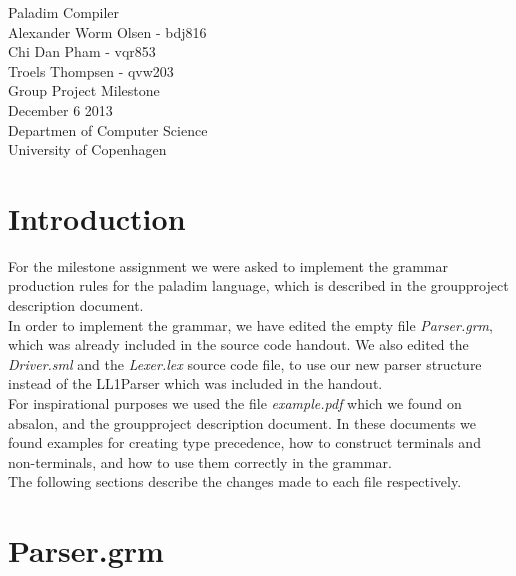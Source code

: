 \documentclass[12pt,a4paper,english]{article}
\begin{document}
\begin{titlepage}
    \vspace*{\fill}
    \begin{center}
      {\Huge Paladim Compiler}\\[0.7cm]
      {\large Alexander Worm Olsen - bdj816}\\[0.4cm]
      {\large Chi Dan Pham - vqr853}\\[0.4cm]
      {\large Troels Thompsen - qvw203}\\[0.4cm]
      {\small Group Project Milestone}\\[0.3cm]
      {\small December 6 2013}\\[0.3cm] 
      {\small Departmen of Computer Science}\\
      {\small University of Copenhagen}
    \end{center}
    \vspace*{\fill}
\end{titlepage}

\tableofcontents
\newpage
\section{Introduction}

For the milestone assignment we were asked to implement the grammar production rules for the paladim language, which is described in the groupproject description document.\\

In order to implement the grammar, we have edited the empty file \textit{Parser.grm}, which was already included in the source code handout. We also edited the \textit{Driver.sml} and the \textit{Lexer.lex} source code file, to use our new parser structure instead of the LL1Parser which was included in the handout. \\

For inspirational purposes we used the file \textit{example.pdf} which we found on absalon, and the groupproject description document. In these documents we found examples for creating type precedence, how to construct terminals and non-terminals, and how to use them correctly in the grammar.  \\

The following sections describe the changes made to each file respectively.

\section{Parser.grm}
\end{document}
